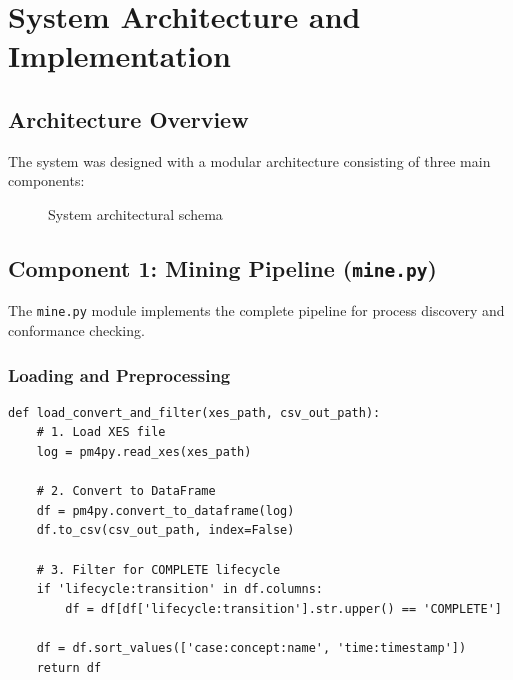 \documentclass[a4paper,twoside,12pt]{article}
\begin{document}
\section{System Architecture and Implementation}

\subsection{Architecture Overview}

The system was designed with a modular architecture consisting of three main components:

\begin{figure}[H]
\centering
{}
\caption{System architectural schema}
\end{figure}

\subsection{Component 1: Mining Pipeline (\texttt{mine.py})}

The \texttt{mine.py} module implements the complete pipeline for process discovery and conformance checking.

\subsubsection{Loading and Preprocessing}

\begin{lstlisting}[caption={Loading and preprocessing function}]
def load_convert_and_filter(xes_path, csv_out_path):
    # 1. Load XES file
    log = pm4py.read_xes(xes_path)
    
    # 2. Convert to DataFrame
    df = pm4py.convert_to_dataframe(log)
    df.to_csv(csv_out_path, index=False)
    
    # 3. Filter for COMPLETE lifecycle
    if 'lifecycle:transition' in df.columns:
        df = df[df['lifecycle:transition'].str.upper() == 'COMPLETE']
    
    df = df.sort_values(['case:concept:name', 'time:timestamp'])
    return df
\end{lstlisting}
\end{document}
